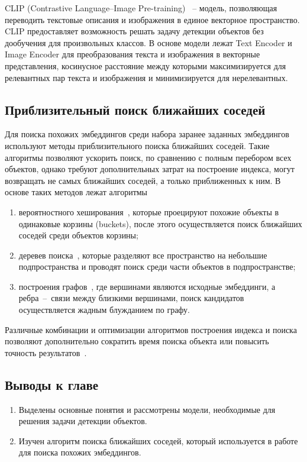 \documentclass[a4paper,14pt]{article}
\begin{document}
    CLIP (Contrastive Language–Image Pre-training)~\cite{CLIP} -- модель, позволяющая переводить текстовые описания и изображения в единое векторное пространство.
    CLIP предоставляет возможность решать задачу детекции объектов без дообучения для произвольных классов.
    В основе модели лежат Text Encoder и Image Encoder для преобразования текста и изображения в векторные представления, косинусное расстояние между которыми максимизируется для релевантных пар текста и изображения и минимизируется для нерелевантных.

    \subsection{Приблизительный поиск ближайших соседей}

    Для поиска похожих эмбеддингов среди набора заранее заданных эмбеддингов используют методы приблизительного поиска ближайших соседей.
    Такие алгоритмы позволяют ускорить поиск, по сравнению с полным перебором всех объектов, однако требуют дополнительных затрат на построение индекса,
    могут возвращать не самых ближайших соседей, а только приближенных к ним.
    В основе таких методов лежат алгоритмы
    \begin{enumerate}
        [1)]
        \itemsep0em
        \item вероятностного хеширования~\cite{tao2010efficient}, которые проецируют похожие объекты в одинаковые корзины (buckets), после этого осуществляется поиск ближайших соседей среди объектов корзины;
        \item деревев поиска~\cite{liu2006new}, которые разделяют все пространство на небольшие подпространства и проводят поиск среди части объектов в подпространстве;
        \item построения графов~\cite{malkov2018efficient}, где вершинами являются исходные эмбеддинги, а
        ребра~--~связи между близкими вершинами, поиск кандидатов осуществляется жадным блужданием по графу.
    \end{enumerate}
    Различные комбинации и оптимизации алгоритмов построения индекса и поиска позволяют дополнительно сократить время поиска объекта или повысить точность результатов~\cite{annoy,avq_2020}.

    \subsection{Выводы к главе \thesection}
    \begin{enumerate}
        \itemsep0em
        \item Выделены основные понятия и рассмотрены модели, необходимые для решения задачи детекции объектов.
        \item Изучен алгоритм поиска ближайших соседей, который используется в работе для поиска похожих эмбеддингов.
    \end{enumerate}
\end{document}
